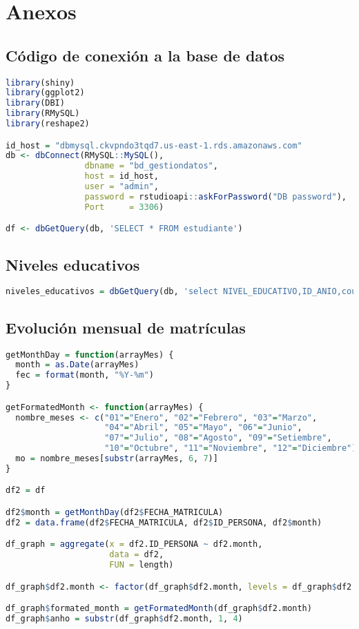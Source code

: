 \chapter{Anexos}
\label{Anexos} %

 \section{Código de conexión a la base de datos}\label{codigo_conexionbd}
\begin{lstlisting}[language=R]
library(shiny)
library(ggplot2)
library(DBI)
library(RMySQL)
library(reshape2)

id_host = "dbmysql.ckvpndo3tqd7.us-east-1.rds.amazonaws.com"
db <- dbConnect(RMySQL::MySQL(),
                dbname = "bd_gestiondatos",
                host = id_host,
                user = "admin",
                password = rstudioapi::askForPassword("DB password"),
                Port     = 3306)

df <- dbGetQuery(db, 'SELECT * FROM estudiante')
\end{lstlisting}

\section{Niveles educativos}\label{cod_niveles_educativos}
\begin{lstlisting}[language=R]
niveles_educativos = dbGetQuery(db, 'select NIVEL_EDUCATIVO,ID_ANIO,count(*)CNT from estudiante group by NIVEL_EDUCATIVO,ID_ANIO')
\end{lstlisting}

\section{Evolución mensual de matrículas}\label{cod_evolucion_matriculas}
\begin{lstlisting}[language=R]
getMonthDay = function(arrayMes) {
  month = as.Date(arrayMes)
  fec = format(month, "%Y-%m")
}

getFormatedMonth <- function(arrayMes) {
  nombre_meses <- c("01"="Enero", "02"="Febrero", "03"="Marzo",
                    "04"="Abril", "05"="Mayo", "06"="Junio",
                    "07"="Julio", "08"="Agosto", "09"="Setiembre",
                    "10"="Octubre", "11"="Noviembre", "12"="Diciembre")
  mo = nombre_meses[substr(arrayMes, 6, 7)]
}

df2 = df

df2$month = getMonthDay(df2$FECHA_MATRICULA)
df2 = data.frame(df2$FECHA_MATRICULA, df2$ID_PERSONA, df2$month)

df_graph = aggregate(x = df2.ID_PERSONA ~ df2.month, 
                     data = df2, 
                     FUN = length)

df_graph$df2.month <- factor(df_graph$df2.month, levels = df_graph$df2.month, ordered=T)

df_graph$formated_month = getFormatedMonth(df_graph$df2.month)
df_graph$anho = substr(df_graph$df2.month, 1, 4)


\end{lstlisting}

